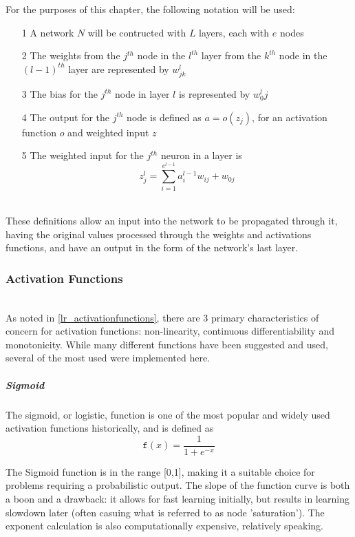 \documentclass[a4paper,latin]{paper}
\begin{document}
For the purposes of this chapter, the following notation will be used:

\begin{itemize}
\item[1] A network $N$ will be contructed with $L$ layers, each with $e$ nodes
\item[2] The weights from the $j^{th}$ node in the $l^{th}$ layer from the $k^{th}$ node in the $(l-1)^{th}$ layer are represented by $w^l_{jk}$
\item[3] The bias for the $j^{th}$ node in layer $l$ is represented by $w^l_0j$
\item[4] The output for the $j^{th}$ node is defined as $a = o(z_j)$, for an activation function $o$ and weighted input $z$
\item[5] The weighted input for the $j^{th}$ neuron in a layer is 
\begin{equation}\label{eq_weighted_input}
	z^l_j=\sum_{i=1}^{e^{l-1}}{a^{l-1}_iw_{ij}} + w_{0j}
\end{equation}
\end{itemize}
~\\
These definitions allow an input into the network to be propagated through it, having the original values processed through the weights and activations functions, and have an output in the form of the network's last layer.

\subsubsection{Activation Functions}\label{imp_activation_functions}
~\\
As noted in \ref{lr_activationfunctions}, there are 3 primary characteristics of concern for activation functions: non-linearity, continuous differentiability and monotonicity. While many different functions have been suggested and used, several of the most used were implemented here.

\subparagraph{Sigmoid}

The sigmoid, or logistic, function is one of the most popular and widely used activation functions historically, and is defined as 
\begin{equation}\label{func_sigmoid}
\texttt{f}(x) = \frac{1}{1 + e^{-x}}
\end{equation}

The Sigmoid function is in the range [0,1], making it a suitable choice for problems requiring a probabilistic output. The slope of the function curve is both a boon and a drawback: it allows for fast learning initially, but results in learning slowdown later (often casuing what is referred to as node 'saturation'). The exponent calculation is also computationally expensive, relatively speaking.
\end{document}
